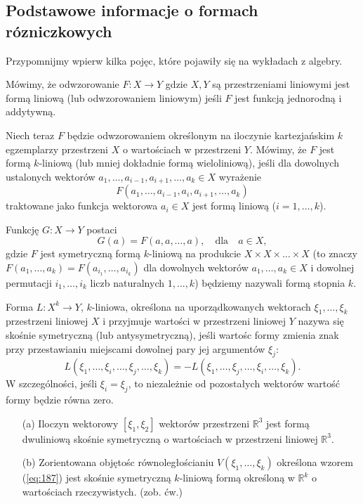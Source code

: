 \documentclass[leqno]{article}
\begin{document}
\begin{justify}
\subsection{Podstawowe informacje o formach rózniczkowych}

Przypomnijmy wpierw kilka pojęc, które pojawiły się na wykładach z algebry.

\begin{defn}
    Mówimy, że odwzorowanie $F : X \to Y$ gdzie $X,Y$ są przestrzeniami liniowymi jest formą liniową (lub odwzorowaniem liniowym) jeśli $F$ jest funkcją 
    jednorodną i addytywną.
\end{defn}

Niech teraz $F$ będzie odwzorowaniem określonym na iloczynie kartezjańskim $k$ egzemplarzy przestrzeni $X$ o wartościach w przestrzeni $Y$.
Mówimy, że $F$ jest formą $k$-liniową (lub mniej dokładnie formą wieloliniową), jeśli dla dowolnych ustalonych wektorów $a_1, \ldots, a_{i-1}, a_{i+1}, \ldots, a_k \in X$ wyrażenie 
\[
    F(a_1, \ldots, a_{i-1}, a_i, a_{i+1}, \ldots, a_k)
\]
traktowane jako funkcja wektorowa $a_i \in X$ jest formą liniową ($i = 1, \ldots, k$).

\begin{defn}
    Funkcję $G : X \to Y$ postaci 
    \[
        G(a) = F(a, a, \ldots, a), \quad \text{dla} \quad a \in X,
    \]
    gdzie $F$ jest symetryczną formą $k$-liniową na produkcie $X \times X \times \ldots \times X$ (to znaczy $F(a_1, \ldots, a_k) = F(a_{i_1}, \ldots, a_{i_k})$
    dla dowolnych wektorów $a_1, \ldots, a_k \in X$ i dowolnej permutacji $i_1, \ldots, i_k$ liczb naturalnych $1, \ldots, k$) będziemy nazywali formą stopnia $k$.
\end{defn}

\begin{defn}
    Forma $L : X^k \to Y$, $k$-liniowa, określona na uporządkowanych wektorach $\xi_1, \ldots,  \xi_k$ przestrzeni liniowej $X$
    i przyjmuje wartości w przestrzeni liniowej $Y$ nazywa się skośnie symetryczną (lub antysymetryczną), jeśli wartośc formy zmienia znak 
    przy przestawianiu miejscami dowolnej pary jej argumentów $\xi_j$:
    \[
        L(\xi_1, \ldots, \xi_i, \ldots, \xi_j, \ldots, \xi_k) = -L(\xi_1, \ldots, \xi_j, \ldots, \xi_i, \ldots, \xi_k).
    \]
    W szczególności, jeśli $\xi_i = \xi_j$, to niezależnie od pozostałych wektorów wartość formy będzie równa zero.
\end{defn}

\begin{ex}
    \begin{itemize}
        \item [(a)]
            Iloczyn wektorowy $[\xi_1, \xi_2]$ wektorów przestrzeni $\mathbb{R}^3$ jest formą dwuliniową skośnie symetryczną o wartościach w przestrzeni liniowej $\mathbb{R}^3$.
        \item [(b)]
            Zorientowana objętośc równoległościaniu $V(\xi_1, \ldots, \xi_k)$ określona wzorem (\ref{eq:187}) jest skośnie symetryczną $k$-liniową formą określoną w $\mathbb{R}^k$
            o wartościach rzeczywistych. (zob. ćw.)
    \end{itemize}
\end{ex}


\end{justify}
\end{document}
